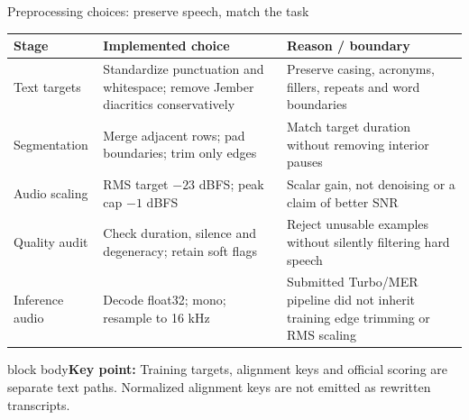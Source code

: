 \documentclass[aspectratio=169,11pt]{beamer}
\newcommand{\takeaway}[1]{\vfill\begin{beamercolorbox}[sep=2mm,wd=\linewidth]{block body}\small\textbf{Key point:} #1\end{beamercolorbox}}
\begin{document}
\begin{frame}{Preprocessing choices: preserve speech, match the task}
\small
\begin{tabular}{@{}P{3.0cm}P{7.7cm}P{5.5cm}@{}}\toprule
\textbf{Stage}&\textbf{Implemented choice}&\textbf{Reason / boundary}\\\midrule
Text targets&Standardize punctuation and whitespace; remove Jember diacritics conservatively&Preserve casing, acronyms, fillers, repeats and word boundaries\\
Segmentation&Merge adjacent rows; pad boundaries; trim only edges&Match target duration without removing interior pauses\\
Audio scaling&RMS target $-23$ dBFS; peak cap $-1$ dBFS&Scalar gain, not denoising or a claim of better SNR\\
Quality audit&Check duration, silence and degeneracy; retain soft flags&Reject unusable examples without silently filtering hard speech\\
Inference audio&Decode float32; mono; resample to 16 kHz&Submitted Turbo/MER pipeline did not inherit training edge trimming or RMS scaling\\\bottomrule
\end{tabular}
\takeaway{Training targets, alignment keys and official scoring are separate text paths. Normalized alignment keys are not emitted as rewritten transcripts.}
\end{frame}
\end{document}
